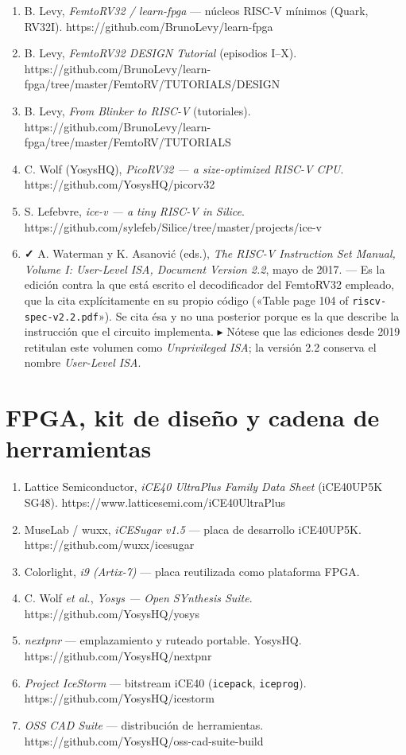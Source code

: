 \begin{enumerate}
\def\labelenumi{\arabic{enumi}.}
\tightlist
\item
  B. Levy, \emph{FemtoRV32 / learn-fpga} --- núcleos RISC-V mínimos
  (Quark, RV32I). https://github.com/BrunoLevy/learn-fpga
\item
  B. Levy, \emph{FemtoRV32 DESIGN Tutorial} (episodios I--X).
  https://github.com/BrunoLevy/learn-fpga/tree/master/FemtoRV/TUTORIALS/DESIGN
\item
  B. Levy, \emph{From Blinker to RISC-V} (tutoriales).
  https://github.com/BrunoLevy/learn-fpga/tree/master/FemtoRV/TUTORIALS
\item
  C. Wolf (YosysHQ), \emph{PicoRV32 --- a size-optimized RISC-V CPU}.
  https://github.com/YosysHQ/picorv32
\item
  S. Lefebvre, \emph{ice-v --- a tiny RISC-V in Silice}.
  https://github.com/sylefeb/Silice/tree/master/projects/ice-v
\item
  \textbf{✓} A. Waterman y K. Asanović (eds.), \emph{The RISC-V
  Instruction Set Manual, Volume I: User-Level ISA, Document Version
  2.2}, mayo de 2017. --- Es la edición contra la que está escrito el
  decodificador del FemtoRV32 empleado, que la cita explícitamente en su
  propio código («Table page 104 of \texttt{riscv-spec-v2.2.pdf}»). Se
  cita ésa y no una posterior porque es la que describe la instrucción
  que el circuito implementa. ▸ Nótese que las ediciones desde 2019
  retitulan este volumen como \emph{Unprivileged ISA}; la versión 2.2
  conserva el nombre \emph{User-Level ISA}.
\end{enumerate}

\section{FPGA, kit de diseño y cadena de
herramientas}\label{fpga-kit-de-diseuxf1o-y-cadena-de-herramientas}

\begin{enumerate}
\def\labelenumi{\arabic{enumi}.}
\setcounter{enumi}{6}
\tightlist
\item
  Lattice Semiconductor, \emph{iCE40 UltraPlus Family Data Sheet}
  (iCE40UP5K SG48). https://www.latticesemi.com/iCE40UltraPlus
\item
  MuseLab / wuxx, \emph{iCESugar v1.5} --- placa de desarrollo
  iCE40UP5K. https://github.com/wuxx/icesugar
\item
  Colorlight, \emph{i9 (Artix-7)} --- placa reutilizada como plataforma
  FPGA.
\item
  C. Wolf \emph{et al.}, \emph{Yosys --- Open SYnthesis Suite}.
  https://github.com/YosysHQ/yosys
\item
  \emph{nextpnr} --- emplazamiento y ruteado portable. YosysHQ.
  https://github.com/YosysHQ/nextpnr
\item
  \emph{Project IceStorm} --- bitstream iCE40 (\texttt{icepack},
  \texttt{iceprog}). https://github.com/YosysHQ/icestorm
\item
  \emph{OSS CAD Suite} --- distribución de herramientas.
  https://github.com/YosysHQ/oss-cad-suite-build
\end{enumerate}

